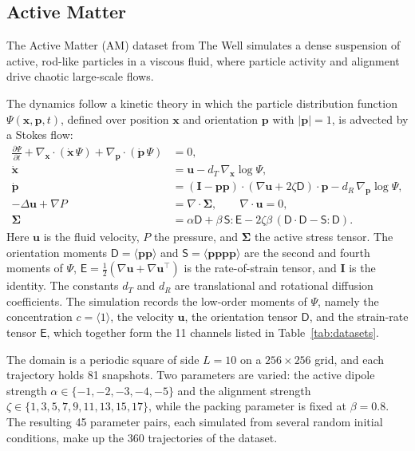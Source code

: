 \documentclass{article}
\begin{document}
\subsection{Active Matter}
The Active Matter (AM) dataset from The Well \citep{ohana2024well, maddu2024learning} simulates a dense suspension of active, rod-like particles in a viscous fluid, where particle activity and alignment drive chaotic large-scale flows.

The dynamics follow a kinetic theory in which the particle distribution function $\Psi(\mathbf{x}, \mathbf{p}, t)$, defined over position $\mathbf{x}$ and orientation $\mathbf{p}$ with $|\mathbf{p}| = 1$, is advected by a Stokes flow:
\begin{align}
  \frac{\partial \Psi}{\partial t} + \nabla_{\mathbf{x}} \cdot (\dot{\mathbf{x}}\,\Psi) + \nabla_{\mathbf{p}} \cdot (\dot{\mathbf{p}}\,\Psi) &= 0, \\
  \dot{\mathbf{x}} &= \mathbf{u} - d_T\, \nabla_{\mathbf{x}} \log \Psi, \\
  \dot{\mathbf{p}} &= (\mathbf{I} - \mathbf{p}\mathbf{p}) \cdot (\nabla \mathbf{u} + 2\zeta \mathsf{D}) \cdot \mathbf{p} - d_R\, \nabla_{\mathbf{p}} \log \Psi, \\
  -\Delta \mathbf{u} + \nabla P &= \nabla \cdot \boldsymbol{\Sigma}, \qquad \nabla \cdot \mathbf{u} = 0, \\
  \boldsymbol{\Sigma} &= \alpha \mathsf{D} + \beta\, \mathsf{S}\!:\!\mathsf{E} - 2\zeta\beta\,(\mathsf{D}\cdot\mathsf{D} - \mathsf{S}\!:\!\mathsf{D}).
\end{align}
Here $\mathbf{u}$ is the fluid velocity, $P$ the pressure, and $\boldsymbol{\Sigma}$ the active stress tensor. The orientation moments $\mathsf{D} = \langle \mathbf{p}\mathbf{p} \rangle$ and $\mathsf{S} = \langle \mathbf{p}\mathbf{p}\mathbf{p}\mathbf{p} \rangle$ are the second and fourth moments of $\Psi$, $\mathsf{E} = \tfrac{1}{2}(\nabla \mathbf{u} + \nabla \mathbf{u}^{\top})$ is the rate-of-strain tensor, and $\mathbf{I}$ is the identity. The constants $d_T$ and $d_R$ are translational and rotational diffusion coefficients. The simulation records the low-order moments of $\Psi$, namely the concentration $c = \langle 1 \rangle$, the velocity $\mathbf{u}$, the orientation tensor $\mathsf{D}$, and the strain-rate tensor $\mathsf{E}$, which together form the 11 channels listed in Table~\ref{tab:datasets}.

The domain is a periodic square of side $L = 10$ on a $256 \times 256$ grid, and each trajectory holds 81 snapshots. Two parameters are varied: the active dipole strength $\alpha \in \{-1, -2, -3, -4, -5\}$ and the alignment strength $\zeta \in \{1, 3, 5, 7, 9, 11, 13, 15, 17\}$, while the packing parameter is fixed at $\beta = 0.8$. The resulting 45 parameter pairs, each simulated from several random initial conditions, make up the 360 trajectories of the dataset.
\end{document}
